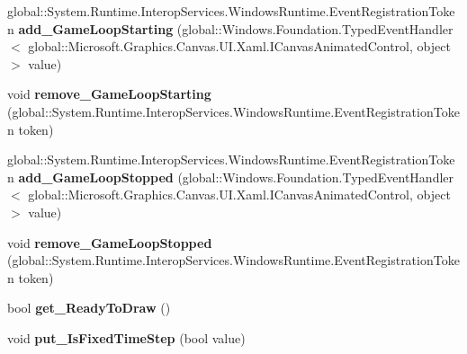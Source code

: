 \begin{DoxyCompactItemize}
global\+::\+System.\+Runtime.\+Interop\+Services.\+Windows\+Runtime.\+Event\+Registration\+Token {\bfseries add\+\_\+\+Game\+Loop\+Starting} (global\+::\+Windows.\+Foundation.\+Typed\+Event\+Handler$<$ global\+::\+Microsoft.\+Graphics.\+Canvas.\+U\+I.\+Xaml.\+I\+Canvas\+Animated\+Control, object $>$ value)
\item 
\mbox{\label{class_microsoft_1_1_graphics_1_1_canvas_1_1_u_i_1_1_xaml_1_1_canvas_animated_control_a45562438048578df83a897e93f9d1463}} 
void {\bfseries remove\+\_\+\+Game\+Loop\+Starting} (global\+::\+System.\+Runtime.\+Interop\+Services.\+Windows\+Runtime.\+Event\+Registration\+Token token)
\item 
\mbox{\label{class_microsoft_1_1_graphics_1_1_canvas_1_1_u_i_1_1_xaml_1_1_canvas_animated_control_a588a0abe17bd1d9b2363fef5d6a6acac}} 
global\+::\+System.\+Runtime.\+Interop\+Services.\+Windows\+Runtime.\+Event\+Registration\+Token {\bfseries add\+\_\+\+Game\+Loop\+Stopped} (global\+::\+Windows.\+Foundation.\+Typed\+Event\+Handler$<$ global\+::\+Microsoft.\+Graphics.\+Canvas.\+U\+I.\+Xaml.\+I\+Canvas\+Animated\+Control, object $>$ value)
\item 
\mbox{\label{class_microsoft_1_1_graphics_1_1_canvas_1_1_u_i_1_1_xaml_1_1_canvas_animated_control_a6e4ad589f4e74a8f247acdee86b8fb7b}} 
void {\bfseries remove\+\_\+\+Game\+Loop\+Stopped} (global\+::\+System.\+Runtime.\+Interop\+Services.\+Windows\+Runtime.\+Event\+Registration\+Token token)
\item 
\mbox{\label{class_microsoft_1_1_graphics_1_1_canvas_1_1_u_i_1_1_xaml_1_1_canvas_animated_control_a7e2eaf078ebdb9e09f670e36cda378a6}} 
bool {\bfseries get\+\_\+\+Ready\+To\+Draw} ()
\item 
\mbox{\label{class_microsoft_1_1_graphics_1_1_canvas_1_1_u_i_1_1_xaml_1_1_canvas_animated_control_a9557ee88a094ee48079b9752be811d33}} 
void {\bfseries put\+\_\+\+Is\+Fixed\+Time\+Step} (bool value)

\end{DoxyCompactItemize}
